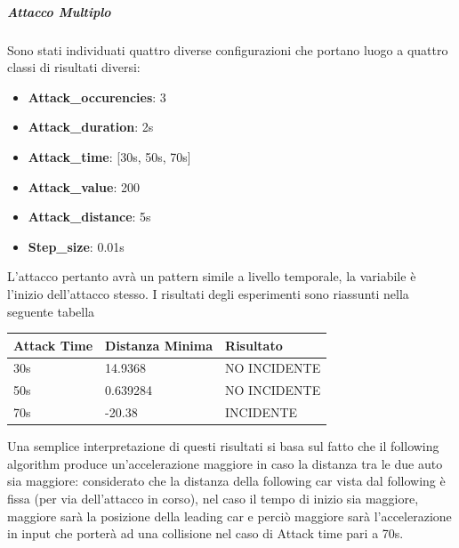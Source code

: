 \subparagraph{Attacco Multiplo}
Sono stati individuati quattro diverse configurazioni che portano luogo a quattro classi di risultati diversi:
\begin{itemize}
	\item \textbf{Attack\_occurencies}: 3
	\item \textbf{Attack\_duration}: 2s
	\item \textbf{Attack\_time}: [30s, 50s, 70s]
	\item \textbf{Attack\_value}: 200
	\item \textbf{Attack\_distance}: 5s
	\item \textbf{Step\_size}: 0.01s
\end{itemize}
L'attacco pertanto avrà un pattern simile a livello temporale, la variabile è l'inizio dell'attacco stesso. I risultati degli esperimenti sono riassunti nella seguente tabella
\begin{center}
	\begin{tabular}{ |p{6cm}|p{3cm}| p{4cm}|  }
		\hline
		Attack Time & Distanza Minima & Risultato \\
		\hline
		30s & 14.9368 & NO INCIDENTE \\
		\hline
		50s & 0.639284 & NO INCIDENTE \\
		\hline
		70s & -20.38 & INCIDENTE \\
		\hline
	\end{tabular}
\end{center}
Una semplice interpretazione di questi risultati si basa sul fatto che il following algorithm produce un'accelerazione maggiore in caso la distanza tra le due auto sia maggiore: considerato che la distanza della following car vista dal following è fissa (per via dell'attacco in corso), nel caso il tempo di inizio sia maggiore, maggiore sarà la posizione della leading car e perciò maggiore sarà l'accelerazione in input che porterà ad una collisione nel caso di Attack time pari a 70s. 
	
